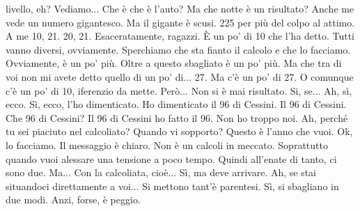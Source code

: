 \begin{soluzione}
{livello, eh? Vediamo... Che è che è l'auto? Ma che notte è un risultato? Anche me vede un numero gigantesco. Ma il gigante è scusi. 225 per più del colpo al attimo. A me 10, 21. 20, 21. Esaceratamente, ragazzi. È un po' di 10 che l'ha detto. Tutti vanno diversi, ovviamente. Sperchiamo che sta fianto il calcolo e che lo facciamo. Ovviamente, è un po' più. Oltre a questo sbagliato è un po' più. Ma che tra di voi non mi avete detto quello di un po' di... 27. Ma c'è un po' di 27. O comunque c'è un po' di 10, iferenzio da mette. Però... Non si è mai risultato. Si, se... Ah, sì, ecco. Sì, ecco, l'ho dimenticato. Ho dimenticato il 96 di Cessini. Il 96 di Cessini. Che 96 di Cessini? Il 96 di Cessini ho fatto il 96. Non ho troppo noi. Ah, perché tu sei piaciuto nel calcoliato? Quando vi sopporto? Questo è l'anno che vuoi. Ok, lo facciamo. Il messaggio è chiaro. Non è un calcoli in meccato. Soprattutto quando vuoi alessare una tensione a poco tempo. Quindi all'enate di tanto, ci sono due. Ma... Con la calcoliata, cioè... Sì, ma deve arrivare. Ah, se stai situandoci direttamente a voi... Si mettono tant'è parentesi. Sì, si sbagliano in due modi. Anzi, forse, è peggio. 
   
}
\end{soluzione}
